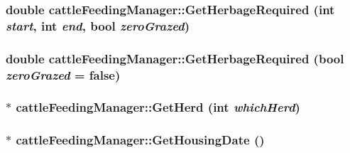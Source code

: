 \label{classcattle_feeding_manager_ade13c39fd50aca07ec357f1a3dbaff2f}
\hypertarget{classcattle_feeding_manager_a4d0a1389bc7cc6fa51824a521e2f83fe}{
\subsubsection[{GetHerbageRequired}]{\setlength{\rightskip}{0pt plus 5cm}double cattleFeedingManager::GetHerbageRequired (int {\em start}, \/  int {\em end}, \/  bool {\em zeroGrazed})}}
\label{classcattle_feeding_manager_a4d0a1389bc7cc6fa51824a521e2f83fe}
\hypertarget{classcattle_feeding_manager_a2ba749a4e41bab1a7fac88fdc7783449}{
\subsubsection[{GetHerbageRequired}]{\setlength{\rightskip}{0pt plus 5cm}double cattleFeedingManager::GetHerbageRequired (bool {\em zeroGrazed} = {\ttfamily false})}}
\label{classcattle_feeding_manager_a2ba749a4e41bab1a7fac88fdc7783449}
\hypertarget{classcattle_feeding_manager_ab32e71fec849f4bb6598b18dcf24bcd4}{
\subsubsection[{GetHerd}]{ $\ast$ cattleFeedingManager::GetHerd (int {\em whichHerd})}}
\label{classcattle_feeding_manager_ab32e71fec849f4bb6598b18dcf24bcd4}
\hypertarget{classcattle_feeding_manager_aae27bce98c713f0c2ee71f49d824f967}{
\subsubsection[{GetHousingDate}]{$\ast$ cattleFeedingManager::GetHousingDate ()}}
